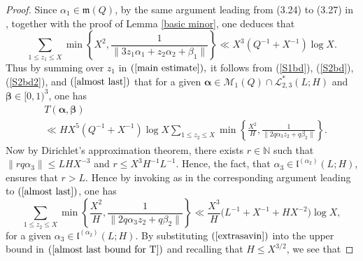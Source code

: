 \documentclass{amsart}%
\numberwithin{equation}{section}
\theoremstyle{remark}
\newcommand{\1}{\mathbbm{1}}
\newcommand{\balp}{\boldsymbol{\alpha}}
\newcommand{\bbet}{\boldsymbol{\beta}}
\begin{document}
\begin{proof}

Since $\alpha_1\in \mathfrak{m}(Q)$, by the same argument leading from (3.24) to (3.27) in \cite{ky2026}, together with the proof of Lemma \ref{basic minor}, one deduces that 
\begin{equation}\label{almost last}
     \sum_{1\leq z_1\leq X}\min\left\{X^{2},\frac{1}{\|3z_1\alpha_1+z_2\alpha_2+\beta_1\|}\right\}\ll X^{3}(Q^{-1}+X^{-1})\log X.
\end{equation}
Thus by summing over $z_1$ in $(\ref{main estimate}),$ it follows from (\ref{S1bd}), (\ref{S2bd}),(\ref{S2bd2}), and $(\ref{almost last})$ that for a given $\boldsymbol{\alpha}\in \mathcal{M}_1(Q)\cap \mathcal{L}^*_{2,3}(L;H)$ and $\boldsymbol{\beta}\in [0,1)^3$, one has
\begin{equation}\label{almost last bound for T}
    \begin{aligned}
&T(\boldsymbol{\alpha},\boldsymbol{\beta})\\
&\ll HX^{5}\left(Q^{-1}+X^{-1}\right)\log X\sum_{1\leq z_2\leq X}\min\left\{\frac{X^{2}}{H},\frac{1}{\|2q\alpha_3z_2+q\beta_2\|}\right\}.
    \end{aligned}
\end{equation}
Now by Dirichlet's approximation theorem, there exists $r\in \mathbb{N}$ such that $\|rq\alpha_3\|\leq LHX^{-3}$ and $r\leq X^3H^{-1}L^{-1}$. Hence, the fact, that $\alpha_3\in \mathfrak{l}^{(\alpha_2)}(L;H)$, ensures that $r>L.$
Hence by invoking \cite[Lemma 3.2]{MR865981} as in the corresponding argument leading to $(\ref{almost last})$, one has
\begin{equation}\label{extrasavin}
    \sum_{1\leq z_2\leq X}\min\left\{\frac{X^{2}}{H},\frac{1}{\|2q\alpha_3z_2+q\beta_2\|}\right\}\ll \frac{X^{3}}{H}\bigl(L^{-1}+X^{-1}+H{X^{-2}}\bigr)\log X,
\end{equation}
for a given $\alpha_3\in \mathfrak{l}^{(\alpha_2)}(L;H)$. By substituting $(\ref{extrasavin})$ into the upper bound in $(\ref{almost last bound for T})$ and recalling that $H \le X^{3/2}$, 
we see that 

\end{proof}
\end{document}
